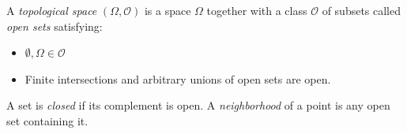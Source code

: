 A \textit{topological space} $(\Omega, \mathcal{O})$ is a space $\Omega$ together with a class $\mathcal{O}$ of subsets called \textit{open sets} satisfying:
\begin{itemize}
\item $\emptyset, \Omega \in \mathcal{O}$
\item Finite intersections and arbitrary unions of open sets are open.
\end{itemize}
A set is \textit{closed} if its complement is open. A \textit{neighborhood} of a point is any open set containing it.
